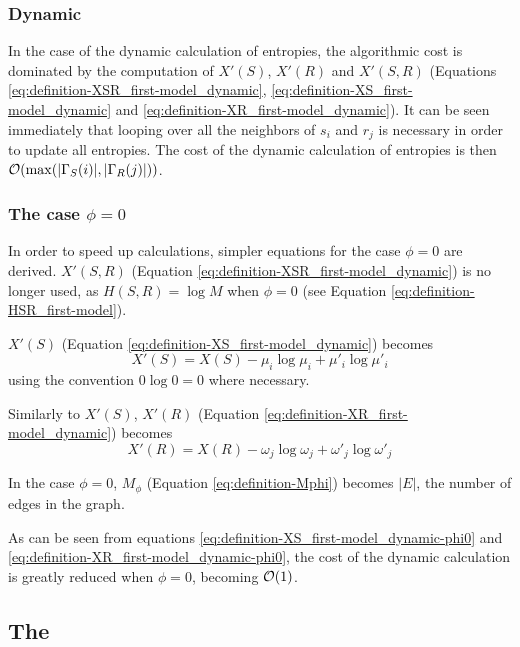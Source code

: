 \subsubsection{Dynamic}

In the case of the dynamic calculation of entropies, the algorithmic cost is dominated by the computation of $X'(S)$, $X'(R)$ and $X'(S,R)$ (Equations \eqref{eq:definition-XSR_first-model_dynamic}, \eqref{eq:definition-XS_first-model_dynamic} and \eqref{eq:definition-XR_first-model_dynamic}).
It can be seen immediately that looping over all the neighbors of $s_i$ and $r_j$ is necessary in order to update all entropies.
The cost of the dynamic calculation of entropies is then $\mathcal{O}(\max(|\Gamma_S(i)|, |\Gamma_R(j)|))$.

\subsubsection{The case $\phi=0$}

In order to speed up calculations, simpler equations for the case $\phi=0$ are derived.
$X'(S,R)$ (Equation \eqref{eq:definition-XSR_first-model_dynamic}) is no longer used, as $H(S,R) = \log M$ when $\phi=0$ (see Equation \eqref{eq:definition-HSR_first-model}).

$X'(S)$ (Equation \eqref{eq:definition-XS_first-model_dynamic}) becomes
\begin{equation}
  \label{eq:definition-XS_first-model_dynamic-phi0}
  X'(S) = X(S) - \mu_i \log \mu_i + \mu'_i \log \mu'_i
\end{equation}
using the convention $0 \log 0 = 0$ where necessary.

Similarly to $X'(S)$, $X'(R)$ (Equation \eqref{eq:definition-XR_first-model_dynamic}) becomes
\begin{equation}
  \label{eq:definition-XR_first-model_dynamic-phi0}
  X'(R) = X(R) - \omega_j \log \omega_j + \omega'_j \log \omega'_j
\end{equation}

In the case $\phi=0$, $M_\phi$ (Equation \eqref{eq:definition-Mphi}) becomes $|E|$, the number of edges in the graph.

As can be seen from equations \eqref{eq:definition-XS_first-model_dynamic-phi0} and \eqref{eq:definition-XR_first-model_dynamic-phi0}, the cost of the dynamic calculation is greatly reduced when $\phi=0$, becoming $\mathcal{O}(1)$.

\subsection{The \secondmodel{}}
\label{sec:model_compute_second-model}

